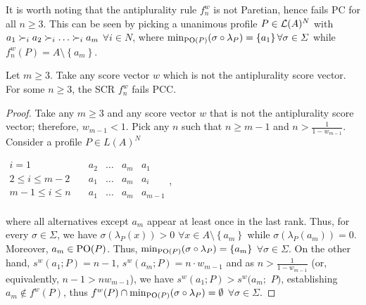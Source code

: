 It is worth noting that the antiplurality rule $f_{n}^{w}$ is not Paretian, hence fails \ac{PC}  for all $n\geq 3$. This can be seen by picking a unanimous profile $P\in \mathcal{L}(A)^{N}$ with $a_{1}\prefi a_{2}\prefi \dots \prefi a_{m}$ $\forall i\in N$, where $\mustar=\left\{ a_{1}\right\} \forall \sigma \in \Sigma $ while $f_{n}^{w}(P)=A \setminus \left\{ a_{m}\right\}$.

\begin{theorem}
	\label{th:srPCC}
	Let $m\geq 3.$ Take any score vector $w$ which is not the antiplurality score vector. For some $n ≥ 3$, the \ac{SCR} $f_{n}^{w}$ fails \ac{PCC}.
\end{theorem}

\begin{proof}
	Take any $m\geq 3$ and any score vector $w$ that is not the antiplurality score vector; therefore, $w_{m-1}<1$. Pick any $n$ such that $n ≥ m - 1$ and $n > \frac{1}{1 - w_{m - 1}}$. Consider a profile $P\in L(A)^{N}$
	
	\begin{center}
		$
		\begin{array}{cccccc}
			i = 1 \quad & a_2 & … & a_m & a_1\\
			2 ≤ i ≤ m - 2 \quad & a_1 & … & a_m & a_i\\
			m - 1 ≤ i ≤ n \quad & a_1 & … & a_m & a_{m-1}\\
		\end{array}
		$\quad,
	\end{center}
	where all alternatives except $a_m$ appear at least once in the last rank.
	Thus, for every $\sigma \in \Sigma$, we have 
	$\sigma (\lambda _{P}(x))>0$ $\forall x\in A \setminus \left\{ a_{m}\right\}$
	while
	$\sigma (\lambda_{P}(a_{m}))=0$. 
	Moreover, $a_{m}\in \text{PO}(P)$. Thus, $\mustar=\left\{ a_{m}\right\} $ $\forall \sigma \in \Sigma $. On the other hand, $s^{w}(a_{1}; P)=n-1$, $s^{w}(a_{m}; P)=n\cdot w_{m-1}$ and
	as $n > \frac{1}{1 - w_{m - 1}}$ (or, equivalently, $n - 1 > n w_{m - 1}$), we have $s^{w}(a_{1}; P)>s^{w}(a_{m};$ $P)$,
	establishing $a_{m}\notin f^{w}(P)$, thus $f^{w}(P)\cap \mustar=\emptyset $ $\forall \sigma \in \Sigma $.
\end{proof}

